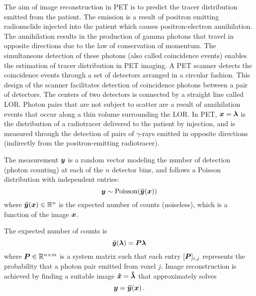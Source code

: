 The aim of image reconstruction in \ac{PET} is to predict the tracer distribution emitted from the patient. The emission is a result of positron emitting radionuclide injected into the patient which causes positron-electron annihilation. The annihilation results in the production of gamma photons that travel in opposite directions due to the law of conservation of momentum. The simultaneous detection of these photons (also called coincidence events) enables the estimation of tracer distribution in \ac{PET} imaging. A \ac{PET} scanner detects the coincidence events through a set of detectors arranged in a circular fashion. This design of the scanner facilitates detection of coincidence photons between a pair of detectors. The centers of two detectors is connected by a straight line called \ac{LOR}. Photon pairs that are not subject to scatter are a result of annihilation events that occur along a thin volume surrounding the \ac{LOR}. In \ac{PET}, $\bm{x} = \bm{\lambda}$ is the distribution of a radiotracer delivered to the patient by injection, and is measured through the detection of pairs of $\gamma$-rays emitted in opposite directions (indirectly from the positron-emitting radiotracer).

The measurement $\bm{y}$ is a random vector modeling the number of detection (photon counting) at each of the $n$ detector bins, and follows a Poisson distribution with independent entries:
\begin{equation}\label{eq:poisson}
\bm{y} \sim \mathrm{Poisson}(\bm{\bar{y}}(\bm{x}))
\end{equation}    
where $\bm{\bar{y}}(\bm{x}) \in \mathbb{R}^n$ is the expected number of counts (noiseless), which is a function of the image $\bm{x}$. 

The expected number of counts is
\begin{equation}\label{eq:PET}
\bm{\bar{y}}(\bm{\lambda}) = \bm{P} \bm{\lambda}
\end{equation}
where $\bm{P} \in \mathbb{R}^{n\times m}$ is a system matrix such that each entry $[\bm{P}]_{i,j}$ represents the probability that a photon pair emitted from voxel $j$. Image reconstruction is achieved by finding a suitable image $\bm{\hat{x}} = \bm{\hat{\lambda}}$ that approximately solves 
\begin{equation}\label{eq:pb1solve}
\bm{y} = \bm{\bar{y}}(\bm{x}) \, .
\end{equation} 

